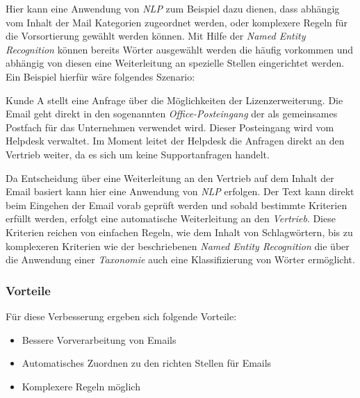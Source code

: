Hier kann eine Anwendung von \textit{NLP} zum Beispiel dazu dienen, dass abhängig vom Inhalt der Mail Kategorien zugeordnet werden, oder komplexere Regeln für die Vorsortierung gewählt werden können. Mit Hilfe der \textit{Named Entity Recognition} können bereits Wörter ausgewählt werden die häufig vorkommen und abhängig von diesen eine Weiterleitung an spezielle Stellen eingerichtet werden. Ein Beispiel hierfür wäre folgendes Szenario:

Kunde A stellt eine Anfrage über die Möglichkeiten der Lizenzerweiterung. Die Email geht direkt in den sogenannten \textit{Office-Posteingang} der als gemeinsames Postfach für das Unternehmen verwendet wird. Dieser Posteingang wird vom Helpdesk verwaltet. Im Moment leitet der Helpdesk die Anfragen direkt an den Vertrieb weiter, da es sich um keine Supportanfragen handelt. 

Da Entscheidung über eine Weiterleitung an den Vertrieb auf dem Inhalt der Email basiert kann hier eine Anwendung von \textit{NLP} erfolgen. Der Text kann direkt beim Eingehen der Email vorab geprüft werden und sobald bestimmte Kriterien erfüllt werden, erfolgt eine automatische Weiterleitung an den \textit{Vertrieb}. Diese Kriterien reichen von einfachen Regeln, wie dem Inhalt von Schlagwörtern, bis zu komplexeren Kriterien wie der beschriebenen  \textit{Named Entity Recognition} die über die Anwendung einer \textit{Taxonomie} auch eine Klassifizierung von Wörter ermöglicht.

\subsubsection{Vorteile}
Für diese Verbesserung ergeben sich folgende Vorteile:

\begin{itemize}
	\item Bessere Vorverarbeitung von Emails
	\item Automatisches Zuordnen zu den richten Stellen für Emails
	\item Komplexere Regeln möglich
\end{itemize}

